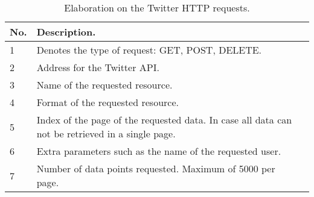 \begin{table}[H] 
\begin{centering}
\begin{tabular}{|l|p{9cm}|l|}
\hline
No.			&	Description. 												\\\hline
1			&	Denotes the type of request: GET, POST, DELETE.				\\\hline
2			&	Address for the Twitter \ac{API}.							\\\hline
3			&	Name of the requested resource.	   							\\\hline
4			&	Format of the requested resource.							\\\hline
5			&	Index of the page of the requested data. In case all data can not be
retrieved in a single page.													\\\hline 
6			&	Extra parameters such as the name of the requested user.	\\\hline
7			&	Number of data points requested. Maximum of 5000 per page.	\\\hline
\end{tabular}
\caption{Elaboration on the Twitter HTTP requests.}
\label{httpElaboration}
\end{centering}
\end{table}
